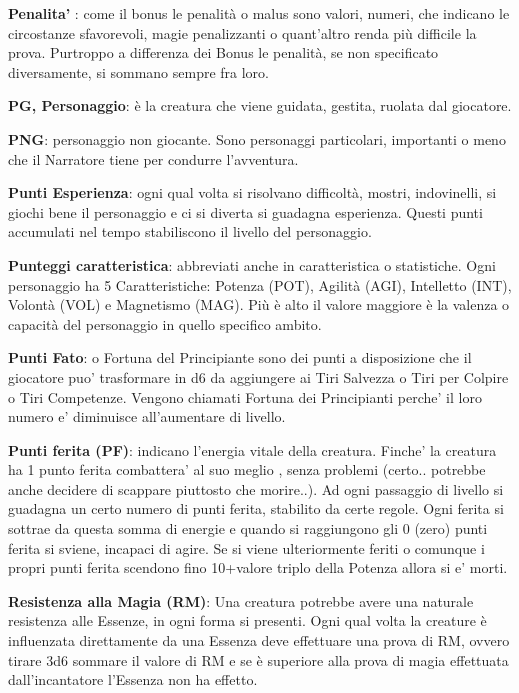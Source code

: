 \documentclass[a4paper,11pt,twoside,openany]{book}
\begin{document}
\textbf{Penalita'} : come il bonus le penalità o malus sono valori, numeri, che indicano le circostanze sfavorevoli, magie penalizzanti o quant'altro renda più difficile la prova. Purtroppo a differenza dei Bonus le penalità, se non specificato diversamente, si sommano sempre fra loro. 

\textbf{PG, Personaggio}: è la creatura che viene guidata, gestita, ruolata dal giocatore.

\textbf{PNG}: personaggio non giocante. Sono personaggi particolari, importanti o meno che il Narratore tiene per condurre l'avventura.

\textbf{Punti Esperienza}:   ogni qual volta si risolvano difficoltà, mostri, indovinelli, si giochi bene il personaggio e ci si diverta si guadagna esperienza. Questi punti accumulati nel tempo stabiliscono il livello del personaggio.

\textbf{Punteggi caratteristica}:   abbreviati anche in caratteristica o statistiche. Ogni personaggio ha 5 Caratteristiche: Potenza (POT), Agilità (AGI), Intelletto (INT), Volontà (VOL) e Magnetismo (MAG). Più è alto il valore maggiore è la valenza o capacità del personaggio in quello specifico ambito.

\textbf{Punti Fato}: o Fortuna del Principiante sono dei punti a disposizione che il giocatore puo’ trasformare in d6 da aggiungere ai Tiri Salvezza o Tiri per Colpire o Tiri Competenze. Vengono chiamati Fortuna dei Principianti perche’ il loro numero e’ diminuisce all’aumentare di livello.

\textbf{Punti ferita (PF)}: indicano l’energia vitale della creatura. Finche’ la creatura ha 1 punto ferita combattera’ al suo meglio , senza problemi (certo.. potrebbe anche decidere di scappare piuttosto che morire..).
Ad ogni passaggio di livello si guadagna un certo numero di punti ferita, stabilito da certe regole. Ogni ferita si sottrae da questa somma di energie e quando si raggiungono gli 0 (zero) punti ferita si sviene, incapaci di agire. Se si viene ulteriormente feriti o comunque i propri punti ferita scendono fino 10+valore triplo della Potenza allora si e’ morti.

\textbf{Resistenza alla Magia (RM)}: Una creatura potrebbe avere una naturale resistenza alle Essenze, in ogni forma si presenti. Ogni qual volta la creature è influenzata direttamente da una Essenza deve effettuare una prova di RM, ovvero tirare 3d6 sommare il valore di RM e se è superiore alla prova di magia effettuata dall'incantatore l'Essenza non ha effetto.
\end{document}
